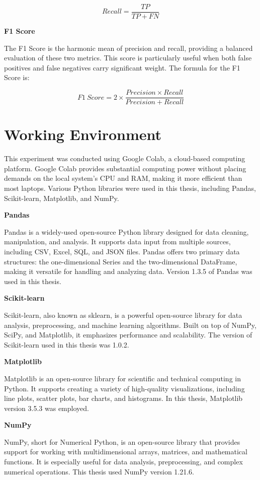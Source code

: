 \documentclass[12pt]{report}
\begin{document}
    \[Recall = \frac{TP}{TP + FN}\]

    {\bfseries F1 Score}

    The F1 Score is the harmonic mean of precision and recall, providing a balanced evaluation of these two metrics. This score is particularly useful when both false positives and false negatives carry significant weight. The formula for the F1 Score is:

    \[F1\ Score = 2 \times \frac{Precision \times Recall}{Precision + Recall}\]

    \section{Working Environment}
    This experiment was conducted using Google Colab, a cloud-based computing platform. Google Colab provides substantial computing power without placing demands on the local system’s CPU and RAM, making it more efficient than most laptops. Various Python libraries were used in this thesis, including Pandas, Scikit-learn, Matplotlib, and NumPy.

    {\bfseries Pandas}

    Pandas is a widely-used open-source Python library designed for data cleaning, manipulation, and analysis. It supports data input from multiple sources, including CSV, Excel, SQL, and JSON files. Pandas offers two primary data structures: the one-dimensional Series and the two-dimensional DataFrame, making it versatile for handling and analyzing data. Version 1.3.5 of Pandas was used in this thesis.

    {\bfseries Scikit-learn}

    Scikit-learn, also known as sklearn, is a powerful open-source library for data analysis, preprocessing, and machine learning algorithms. Built on top of NumPy, SciPy, and Matplotlib, it emphasizes performance and scalability. The version of Scikit-learn used in this thesis was 1.0.2.
    
    {\bfseries Matplotlib}

    Matplotlib is an open-source library for scientific and technical computing in Python. It supports creating a variety of high-quality visualizations, including line plots, scatter plots, bar charts, and histograms. In this thesis, Matplotlib version 3.5.3 was employed.

    {\bfseries NumPy}

    NumPy, short for Numerical Python, is an open-source library that provides support for working with multidimensional arrays, matrices, and mathematical functions. It is especially useful for data analysis, preprocessing, and complex numerical operations. This thesis used NumPy version 1.21.6.
\end{document}
